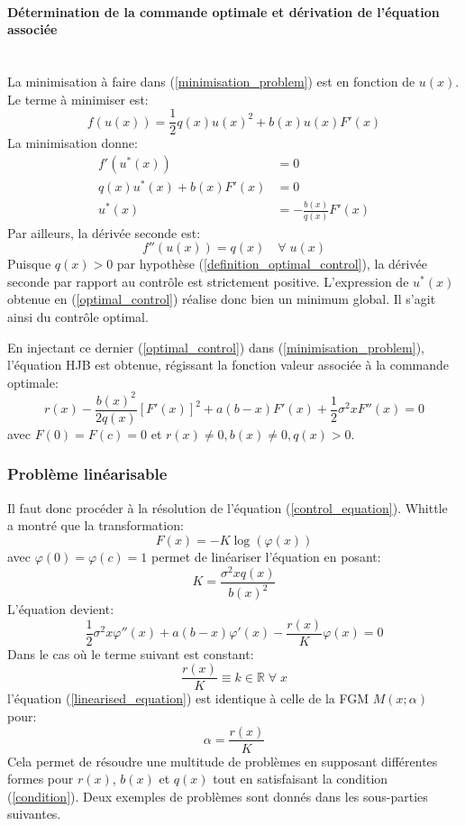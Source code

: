 \paragraph{Détermination de la commande optimale et dérivation de l'équation associée}\phantom{}\\
La minimisation à faire dans (\ref{minimisation_problem}) est en fonction de $u(x)$. Le terme à minimiser est:
\[
f(u(x))=\frac{1}{2}q(x){u(x)}^2+b(x)u(x)F'(x)
\]
La minimisation donne:
\begin{equation}\label{optimal_control}
    \begin{aligned}
        f'(u^*(x))&=0\\
        q(x)u^*(x)+b(x)F'(x)&=0\\
    u^*(x)&=-\frac{b(x)}{q(x)}F'(x)
    \end{aligned}
\end{equation}
Par ailleurs, la dérivée seconde est: 
\[
f''(u(x))=q(x)\quad\forall\;u(x)
\]
Puisque \( q(x) > 0 \) par hypothèse (\ref{definition_optimal_control}), la dérivée seconde par rapport au contrôle est strictement positive. L'expression de \( u^*(x) \) obtenue en (\ref{optimal_control}) réalise donc bien un minimum global. Il s'agit ainsi du contrôle optimal.

En injectant ce dernier (\ref{optimal_control}) dans (\ref{minimisation_problem}), l'équation \acl{HJB} est obtenue, régissant la fonction valeur associée à la commande optimale:
\begin{equation}\label{control_equation}
    r(x) - \frac{{b(x)}^2}{2q(x)}{\left[F'(x)\right]}^2 + a(b - x)F'(x) + \frac{1}{2}\sigma^2 x F''(x) = 0
\end{equation}
avec $F(0)=F(c)=0$ et $r(x)\neq0, b(x)\neq0, q(x)>0$.


\subsubsection{Problème linéarisable}

Il faut donc procéder à la résolution de l'équation (\ref{control_equation}). Whittle~\cite{whittle1982} a montré que la transformation: 
\[F(x)=-K\log(\varphi(x))\]
avec $\varphi(0)=\varphi(c)=1$ permet de linéariser l'équation en posant:
\[
K=\frac{\sigma^2xq(x)}{{b(x)}^2}
\]
L'équation devient:
\begin{equation}\label{linearised_equation}
    \frac{1}{2}\sigma^2 x\varphi''(x) + a(b - x)\varphi'(x) - \frac{r(x)}{K}\varphi(x) = 0
\end{equation}
Dans le cas où le terme suivant est constant:
\begin{equation}\label{condition}
    \frac{r(x)}{K}\equiv k\in\mathds{R}\;\forall\;x
\end{equation}
l'équation (\ref{linearised_equation}) est identique à celle de la \acl{FGM} $M(x;\alpha)$ pour:
\[
\alpha=\frac{r(x)}{K}
\]
Cela permet de résoudre une multitude de problèmes en supposant différentes formes pour $r(x)$, $b(x)$ et $q(x)$ tout en satisfaisant la condition (\ref{condition}). 
Deux exemples de problèmes sont donnés dans les sous-parties suivantes.

